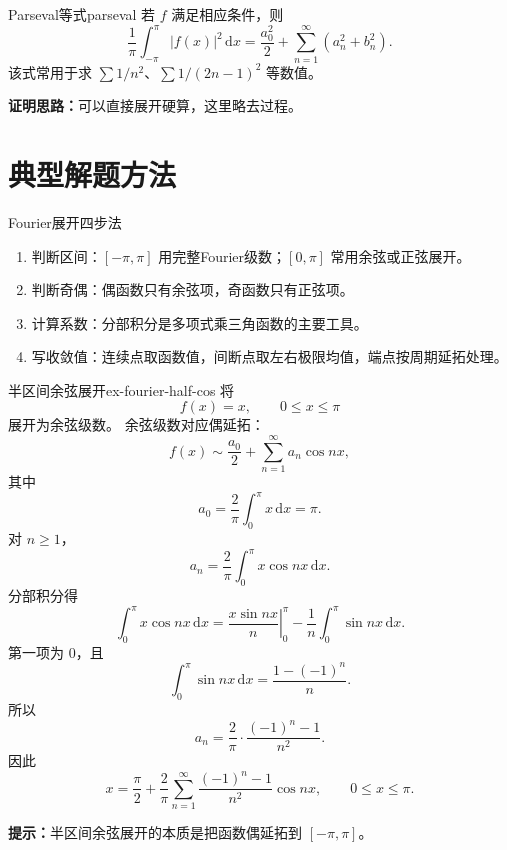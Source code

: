 \documentclass[UTF8,zihao=-4,openany]{ctexbook}
\newcommand{\dd}{\,\mathrm{d}}
\begin{document}
\begin{theorem}{Parseval等式}{parseval}
若 $f$ 满足相应条件，则
\[
\frac1\pi\int_{-\pi}^{\pi}|f(x)|^2\dd x=\frac{a_0^2}{2}+\sum_{n=1}^{\infty}(a_n^2+b_n^2).
\]
该式常用于求 $\sum 1/n^2$、$\sum 1/(2n-1)^2$ 等数值。
\end{theorem}
\textbf{证明思路：}可以直接展开硬算，这里略去过程。
\section{典型解题方法}

\begin{methodbox}{Fourier展开四步法}
\begin{enumerate}
\item 判断区间：$[-\pi,\pi]$ 用完整Fourier级数；$[0,\pi]$ 常用余弦或正弦展开。
\item 判断奇偶：偶函数只有余弦项，奇函数只有正弦项。
\item 计算系数：分部积分是多项式乘三角函数的主要工具。
\item 写收敛值：连续点取函数值，间断点取左右极限均值，端点按周期延拓处理。
\end{enumerate}
\end{methodbox}

\begin{example}{半区间余弦展开}{ex-fourier-half-cos}
将
\[
  f(x)=x,\qquad 0\leq x\leq \pi
\]
展开为余弦级数。
\tcblower
余弦级数对应偶延拓：
\[
  f(x)\sim \frac{a_0}{2}+\sum_{n=1}^{\infty}a_n\cos nx,
\]
其中
\[
  a_0=\frac{2}{\pi}\int_0^\pi x\,\mathrm{d}x=\pi.
\]
对 $n\geq1$，
\[
  a_n=\frac{2}{\pi}\int_0^\pi x\cos nx\,\mathrm{d}x.
\]
分部积分得
\[
  \int_0^\pi x\cos nx\,\mathrm{d}x
  =
  \left.\frac{x\sin nx}{n}\right|_0^\pi
  -
  \frac{1}{n}\int_0^\pi\sin nx\,\mathrm{d}x.
\]
第一项为 $0$，且
\[
  \int_0^\pi\sin nx\,\mathrm{d}x
  =
  \frac{1-(-1)^n}{n}.
\]
所以
\[
  a_n=\frac{2}{\pi}\cdot \frac{(-1)^n-1}{n^2}.
\]
因此
\[
  x=\frac{\pi}{2}
  +
  \frac{2}{\pi}\sum_{n=1}^{\infty}
  \frac{(-1)^n-1}{n^2}\cos nx,
  \qquad 0\leq x\leq\pi.
\]

\textbf{提示：}半区间余弦展开的本质是把函数偶延拓到 $[-\pi,\pi]$。
\end{example}
\end{document}
